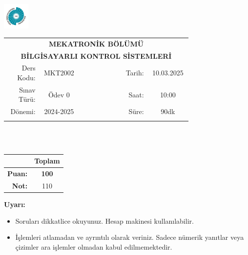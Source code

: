 \newcommand\UniversiteAdi{Niğde Ömer Halisdemir Üniversitesi}
\newcommand\BolumAdi{MEKATRONİK BÖLÜMÜ}
\newcommand\DersKodu{MKT2002}
\newcommand\DersAdi{BİLGİSAYARLI KONTROL SİSTEMLERİ}
\newcommand\SinavAdi{Ödev 0}
\newcommand\SinavTarihi{10.03.2025}
\newcommand\SinavSaati{10:00}
\newcommand\SinavSuresi{90dk}

\pagestyle{fancy}
\fancyhf{} %
\noindent \includegraphics[width=0.1\textwidth]{logo}
\begin{tabular}{
    p{0.15\linewidth}
    p{0.15\linewidth}
    p{0.2\linewidth}
    p{0.1\linewidth}
    p{0.15\linewidth}}
    \multicolumn{5}{c}{\textbf{\BolumAdi}}\\
    \multicolumn{5}{c}{\textbf{\DersAdi}}\\\hline
    \multicolumn{1}{|r|}{Ders Kodu:}&
    \multicolumn{1}{|c|}{\DersKodu}&
    \multicolumn{1}{|c|}{}& 
    \multicolumn{1}{|r|}{Tarih:}&
    \multicolumn{1}{|c|}{\SinavTarihi} \\\hline
    \multicolumn{1}{|r|}{Sınav Türü:}&
    \multicolumn{1}{|c|}{\SinavAdi}&  
    \multicolumn{1}{|c|}{}&
    \multicolumn{1}{|r|}{Saat:}&
    \multicolumn{1}{|c|}{\SinavSaati}\\\hline
    \multicolumn{1}{|r|}{Dönemi:}&
    \multicolumn{1}{|c|}{2024-2025}&
    \multicolumn{1}{|c|}{}&
    \multicolumn{1}{|r|}{Süre:}&
    \multicolumn{1}{|c|}{\SinavSuresi} \\\hline
    &&&&\\
\end{tabular}\\\\
\noindent\begin{center}
\begin{tabular}{|r|c|}\hline
    &\textbf{Toplam}\\\hline
    \textbf{Puan:} &\textbf{100}\\\hline
    \textbf{Not:}  &110\\\hline
\end{tabular}\end{center}
\noindent\textbf{Uyarı:}
\begin{itemize}\bfseries
    \item Soruları dikkatlice okuyunuz. Hesap makinesi kullanılabilir.
    \item İşlemleri atlamadan ve ayrıntılı olarak veriniz. Sadece nümerik yanıtlar veya çizimler ara işlemler olmadan kabul edilmemektedir.
\end{itemize}
